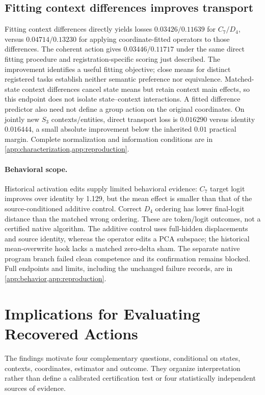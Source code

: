 \documentclass{article}
\begin{document}
\subsection{Fitting context differences improves transport}
Fitting context differences directly yields losses $0.03426/0.11639$ for $C_7/D_4$, versus $0.04714/0.13230$ for applying coordinate-fitted operators to those differences. The coherent action gives $0.03446/0.11717$ under the same direct fitting procedure and registration-specific scoring just described. The improvement identifies a useful fitting objective; close means for distinct registered tasks establish neither semantic preference nor equivalence. Matched-state context differences cancel state means but retain context main effects, so this endpoint does not isolate state--context interactions. A fitted difference predictor also need not define a group action on the original coordinates. On jointly new $S_3$ contexts/entities, direct transport loss is $0.016290$ versus identity $0.016444$, a small absolute improvement below the inherited $0.01$ practical margin. Complete normalization and information conditions are in \cref{app:characterization,app:reproduction}.

\paragraph{Behavioral scope.}
Historical activation edits supply limited behavioral evidence: $C_7$ target logit improves over identity by 1.129, but the mean effect is smaller than that of the source-conditioned additive control. Correct $D_4$ ordering has lower final-logit distance than the matched wrong ordering. These are token/logit outcomes, not a certified native algorithm. The additive control uses full-hidden displacements and source identity, whereas the operator edits a PCA subspace; the historical mean-overwrite hook lacks a matched zero-delta sham. The separate native program branch failed clean competence and its confirmation remains blocked. Full endpoints and limits, including the unchanged failure records, are in \cref{app:behavior,app:reproduction}.

\section{Implications for Evaluating Recovered Actions}
\label{sec:reading-protocol}
The findings motivate four complementary questions, conditional on states, contexts, coordinates, estimator and outcome. They organize interpretation rather than define a calibrated certification test or four statistically independent sources of evidence.
\end{document}
